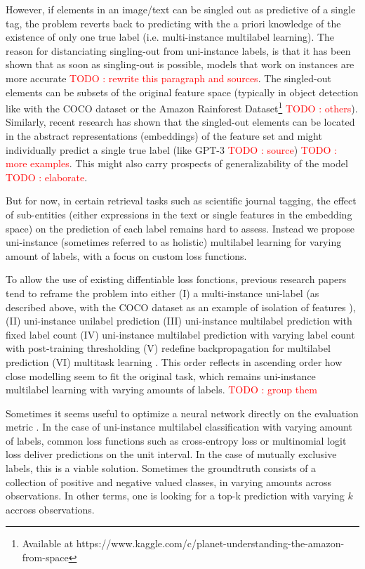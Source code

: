 \documentclass[sigconf,natbib,screen=true,review=true,anonymous]{acmart}
\newcommand\todo[1]{\textcolor{red}{TODO : #1}}
\begin{document}
However, if elements in an image/text can be singled out as predictive of a single tag, the problem reverts back to predicting with the a priori knowledge of the existence of only one true label (i.e. multi-instance multilabel learning).  The reason for distanciating singling-out from uni-instance labels, is that it has been shown that as soon as singling-out is possible, models that work on instances are more accurate \todo{rewrite this paragraph and sources}. The singled-out elements can be subsets of the original feature space (typically in object detection like with the COCO dataset  \cite{COCO} or the Amazon Rainforest Dataset\footnote{Available at https://www.kaggle.com/c/planet-understanding-the-amazon-from-space} \todo{others}). Similarly, recent research has shown that the singled-out elements can be located in the abstract representations (embeddings) of the feature set and might individually predict a single true label (like GPT-3 \todo{source}) \todo{more examples}. This might also carry prospects of generalizability of the model \cite{generalization} \todo{elaborate}. 

But for now, in certain retrieval tasks such as scientific journal tagging, the effect of sub-entities (either expressions in the text or single features in the embedding space) on the prediction of each label remains hard to assess. Instead we propose uni-instance (sometimes referred to as holistic) multilabel learning for varying amount of labels, with a focus on custom loss functions.

To allow the use of existing diffentiable loss fonctions, previous research papers tend to reframe the problem into either (I) a multi-instance uni-label (as described above, with the COCO dataset as an example of isolation of features \cite{COCO}), (II) uni-instance unilabel prediction (III) uni-instance multilabel prediction with fixed label count (IV) uni-instance multilabel prediction with varying label count with post-training thresholding (V) redefine backpropagation for multilabel prediction \cite{multilabelBackprop} (VI) multitask learning \cite{multitaskLabel}. This order reflects in ascending order how close modelling seem to fit the original task, which remains uni-instance multilabel learning with varying amounts of labels. \todo{group them}

Sometimes it seems useful to optimize a neural network directly on the evaluation metric \cite{optimizableLosses}. In the case of uni-instance multilabel classification with varying amount of labels, common loss functions such as cross-entropy loss or multinomial logit loss deliver predictions on the unit interval. In the case of mutually exclusive labels, this is a viable solution. Sometimes the groundtruth consists of a collection of positive and negative valued classes, in varying amounts across observations. In other terms, one is  looking for a top-k prediction with varying \(k\) accross observations.
\end{document}
